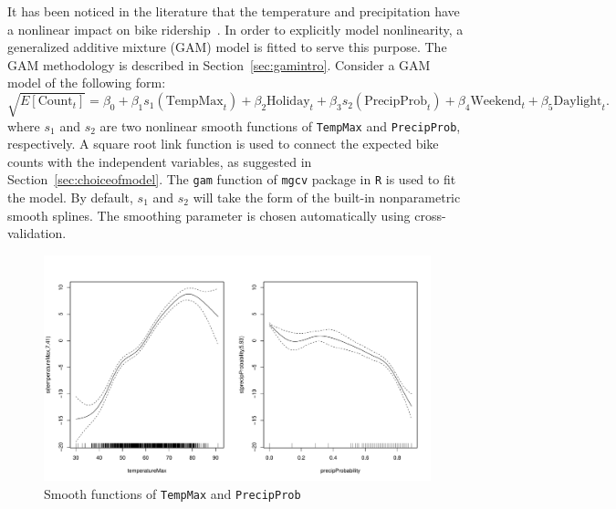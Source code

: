 \documentclass [11pt, proquest] {uwthesis}[2015/03/03]
\begin{document}
It has been noticed in the literature that the temperature and precipitation have a nonlinear impact on bike ridership~\cite{Richardson00,Rose07}. In order to explicitly model nonlinearity, a generalized additive mixture (GAM) model is fitted to serve this purpose. The GAM methodology is described in Section~\ref{sec:gamintro}. Consider a GAM model of the following form:
\begin{equation}
\sqrt{E[\text{Count}_t]} = \beta_0 + \beta_1 s_1(\text{TempMax}_t) + \beta_2 \text{Holiday}_t + \beta_3 s_2(\text{PrecipProb}_t) + \beta_4 \text{Weekend}_t + \beta_5 \text{Daylight}_t. \label{eqref:gamodel}
\end{equation}
where $s_1$ and $s_2$ are two nonlinear smooth functions of \texttt{TempMax} and \texttt{PrecipProb}, respectively. A square root link function is used to connect the expected bike counts with the independent variables, as suggested in Section~\ref{sec:choiceofmodel}. The \texttt{gam} function of \texttt{mgcv} package in \texttt{R} is used to fit the model. By default, $s_1$ and $s_2$ will take the form of the built-in nonparametric smooth splines. The smoothing parameter is chosen automatically using cross-validation.



\begin{figure}
\centering
   \includegraphics[width=1\textwidth]{figures/gam.pdf} 
\vspace{-10pt}
  \caption{Smooth functions of \texttt{TempMax} and \texttt{PrecipProb}}
  \label{fig:smooth}
\vspace{-1.05cm}
\end{figure}
\end{document}

